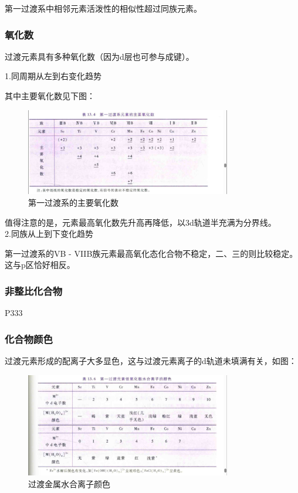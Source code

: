 \documentclass[a4paper,UTF8]{article}
\begin{document}
第一过渡系中相邻元素活泼性的相似性超过同族元素。

\subsubsection{氧化数}

过渡元素具有多种氧化数（因为d层也可参与成键）。

1.同周期从左到右变化趋势

其中主要氧化数见下图：

\begin{figure}[htpb]
	\centering
	\includegraphics[width=0.8\textwidth]{figure//主要氧化数.png}
	\caption{第一过渡系的主要氧化数}
	\label{fig:}
\end{figure}

值得注意的是，元素最高氧化数先升高再降低，以3d轨道半充满为分界线。\\

2.同族从上到下变化趋势

第一过渡系的VB - VIIB族元素最高氧化态化合物不稳定，二、三的则比较稳定。这与p区恰好相反。

\subsubsection{非整比化合物}

P333

\subsubsection{化合物颜色}

过渡元素形成的配离子大多显色，这与过渡元素离子的d轨道未填满有关，如图：

\begin{figure}[htpb]
	\centering
	\includegraphics[width=0.8\textwidth]{figure//过渡金属化合物颜色.png}
	\caption{过渡金属水合离子颜色}
	\label{fig:}
\end{figure}
\end{document}
